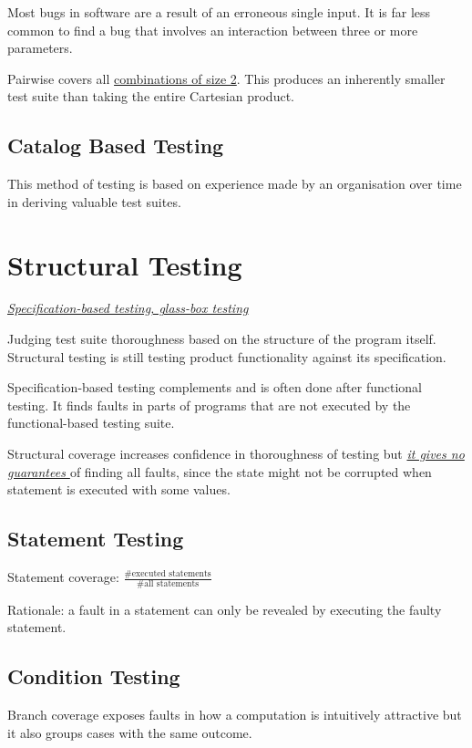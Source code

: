 \documentclass{article}
\begin{document}
Most bugs in software are a result of an erroneous single input. It is far less common to find a bug that involves an interaction between three or more parameters.

Pairwise covers all \underline{combinations of size 2}. This produces an inherently smaller test suite than taking the entire Cartesian product.

\subsection{Catalog Based Testing}

This method of testing is based on experience made by an organisation over time in deriving valuable test suites.

\section{Structural Testing}

\textit{\underline{Specification-based testing, glass-box testing}}

Judging test suite thoroughness based on the structure of the program itself. Structural testing is still testing product functionality against its specification. 

Specification-based testing complements and is often done after functional testing. It finds faults in parts of programs that are not executed by the functional-based testing suite. 

Structural coverage increases confidence in thoroughness of testing but \textit{\underline{it gives no guarantees }}of finding all faults, since the state might not be corrupted when statement is executed with some values.

\subsection{Statement Testing}
Statement coverage: 
$\frac{\text{\# executed statements}}{\text{\# all statements}}$

Rationale: a fault in a statement can only be
revealed by executing the faulty statement.

\subsection{Condition Testing}
Branch coverage exposes faults in how a
computation is intuitively attractive but it also groups cases with the same outcome. 
\end{document}
